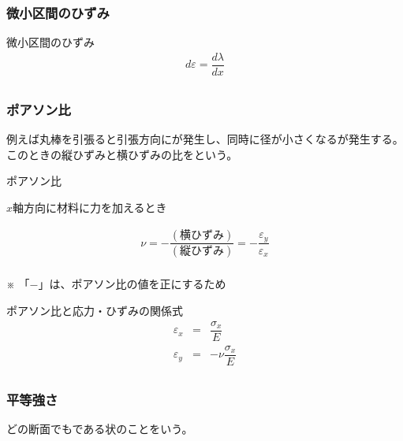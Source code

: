 \documentclass[a4paper]{jsarticle}
\begin{document}
\subsubsection{微小区間のひずみ}
\begin{itembox}[l]{微小区間のひずみ}
    \begin{eqnarray*}
        d\varepsilon=\dfrac{d\lambda}{dx}\\
    \end{eqnarray*}
\end{itembox}
\subsubsection{ポアソン比}
例えば丸棒を引張ると引張方向にが発生し、同時に径が小さくなるが発生する。\\
このときの縦ひずみと横ひずみの比をという。
\begin{itembox}[l]{ポアソン比}
    \begin{center}
        $x$軸方向に材料に力を加えるとき
    \end{center}
    \begin{eqnarray*}
        \nu=-\dfrac{\left(横ひずみ\right)}{\left(縦ひずみ\right)}=-\dfrac{\varepsilon_y}{\varepsilon_x}\\
    \end{eqnarray*}
    \begin{center}
        ※ 「$-$」は、ポアソン比の値を正にするため
    \end{center}
\end{itembox}
\begin{itembox}[l]{ポアソン比と応力・ひずみの関係式}
    \begin{eqnarray*}
        \varepsilon_x&=&\dfrac{\sigma_x}{E}\\
        \varepsilon_y&=&-\nu\dfrac{\sigma_x}{E}\\
    \end{eqnarray*}
\end{itembox}
\subsubsection{平等強さ}
どの断面でもである状のことをいう。
\end{document}
